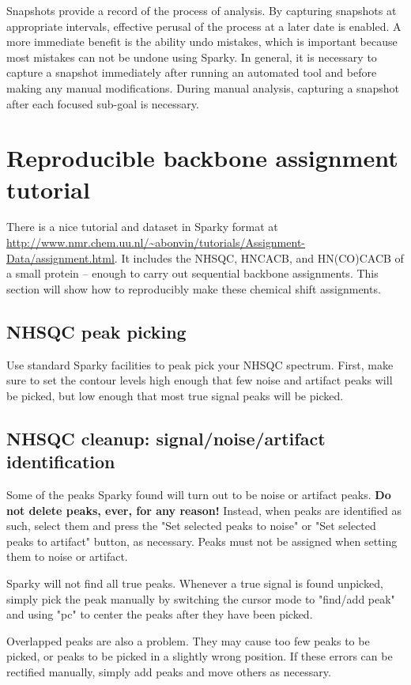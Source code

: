 Snapshots provide a record of the process of analysis.  By capturing snapshots
at appropriate intervals, effective perusal of the process at a later date is
enabled.  A more immediate benefit is the ability undo mistakes, which is 
important because most mistakes can not be undone using Sparky.
In general, it is necessary to capture a snapshot immediately after
running an automated tool and before making any manual modifications.  During
manual analysis, capturing a snapshot after each focused sub-goal is necessary.



\section{Reproducible backbone assignment tutorial}
There is a nice tutorial and dataset in Sparky format at 
\url{http://www.nmr.chem.uu.nl/~abonvin/tutorials/Assignment-Data/assignment.html}.
It includes the NHSQC, HNCACB, and HN(CO)CACB of a small protein -- enough
to carry out sequential backbone assignments.
This section will show how to reproducibly make these chemical shift
assignments.

\subsection*{NHSQC peak picking}
Use standard Sparky facilities to peak pick your NHSQC spectrum.
First, make sure to set the contour levels high enough that few noise and 
artifact peaks will be picked, but low enough that most true signal peaks
will be picked.

\subsection*{NHSQC cleanup: signal/noise/artifact identification}
Some of the peaks Sparky found will turn out to be noise or artifact peaks.
\textbf{Do not delete peaks, ever, for any reason!}  Instead,
when peaks are identified as such, select them and press the "Set selected 
peaks to noise" or "Set selected peaks to artifact" button, as necessary.
Peaks must not be assigned when setting them to noise or artifact.

Sparky will not find all true peaks.  Whenever a true signal is found 
unpicked, simply pick the peak manually by switching the cursor mode to 
"find/add peak" and using "pc" to center the peaks after they have been
picked.

Overlapped peaks are also a problem.  They may cause too few peaks to be 
picked, or peaks to be picked in a slightly wrong position.  If these errors
can be rectified manually, simply add peaks and move others as necessary.

